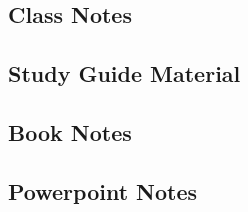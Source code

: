 \documentclass{article}
\begin{document}
\section{}

\subsection{Class Notes}
\subsection{Study Guide Material}
\subsection{Book Notes}
\subsection{Powerpoint Notes}
% 
\end{document}
